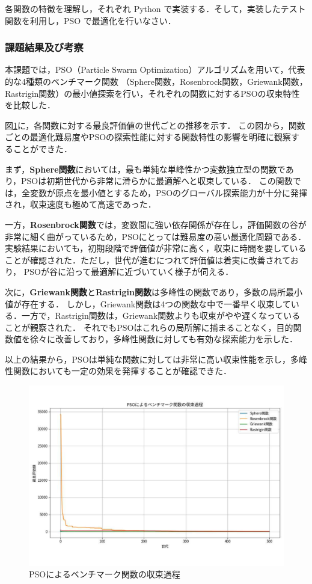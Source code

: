 各関数の特徴を理解し，それぞれ Python で実装する．そして，実装したテスト関数を利用し，PSO で最適化を行いなさい．
\subsubsection{課題結果及び考察}
本課題では，PSO（Particle Swarm Optimization）アルゴリズムを用いて，代表的な4種類のベンチマーク関数
（Sphere関数，Rosenbrock関数，Griewank関数，Rastrigin関数）の最小値探索を行い，それぞれの関数に対するPSOの収束特性を比較した．

図\ref{fig:convergence}に，各関数に対する最良評価値の世代ごとの推移を示す．
この図から，関数ごとの最適化難易度やPSOの探索性能に対する関数特性の影響を明確に観察することができた．

まず，\textbf{Sphere関数}においては，最も単純な単峰性かつ変数独立型の関数であり，PSOは初期世代から非常に滑らかに最適解へと収束している．
この関数では，全変数が原点を最小値とするため，PSOのグローバル探索能力が十分に発揮され，収束速度も極めて高速であった．

一方，\textbf{Rosenbrock関数}では，変数間に強い依存関係が存在し，評価関数の谷が非常に細く曲がっているため，PSOにとっては難易度の高い最適化問題である．
実験結果においても，初期段階で評価値が非常に高く，収束に時間を要していることが確認された．ただし，世代が進むにつれて評価値は着実に改善されており，
PSOが谷に沿って最適解に近づいていく様子が伺える．

次に，\textbf{Griewank関数}と\textbf{Rastrigin関数}は多峰性の関数であり，多数の局所最小値が存在する．
しかし，Griewank関数は4つの関数な中で一番早く収束している．一方で，Rastrigin関数は，Griewank関数よりも収束がやや遅くなっていることが観察された．
それでもPSOはこれらの局所解に捕まることなく，目的関数値を徐々に改善しており，多峰性関数に対しても有効な探索能力を示した．

以上の結果から，PSOは単純な関数に対しては非常に高い収束性能を示し，多峰性関数においても一定の効果を発揮することが確認できた．

\begin{figure}[H]
    \centering
    \includegraphics[width=0.8\linewidth]{figure/収束グラフ.pdf}
    \caption{PSOによるベンチマーク関数の収束過程}
    \label{fig:convergence}
\end{figure}

